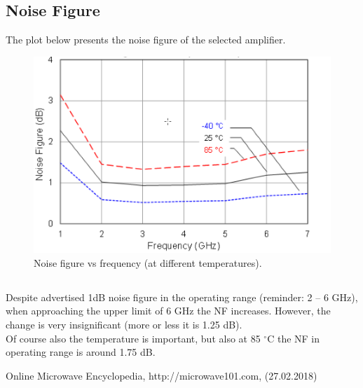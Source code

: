 \documentclass[eng,printmode]{mgr}
\begin{document}
\subsection*{Noise Figure}
The plot below presents the noise figure of the selected amplifier.
\begin{figure}[h]
	\centering
	\includegraphics[width=0.6\linewidth]{noise}
	\caption{Noise figure vs frequency (at different temperatures).}
	\label{fig:noise}
\end{figure}

\subsection*{}
Despite advertised 1dB noise figure in the operating range (reminder: 2 -- 6 GHz), when approaching the upper limit of 6 GHz the NF increases. However, the change is very insignificant (more or less it is 1.25 dB).\\
Of course also the temperature is important, but also at 85 $^\circ$C
the NF in operating range is around 1.75 dB.
\begin{thebibliography}{9}
 Online Microwave Encyclopedia, http://microwave101.com,  (27.02.2018)
\end{thebibliography}
\end{document}
